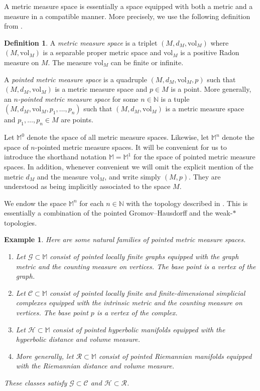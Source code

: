 \documentclass{amsart}
\newcommand{\NN}{\mathbb{N}}
\newcommand{\MM}{\mathbb{M}}
\newcommand{\Graphs}{\mathcal{G}}
\newcommand{\Complexes}{\mathcal{C}}
\newcommand{\Hypers}{\mathcal{H}}
\newcommand{\Riemanns}{\mathcal{R}}
\newcommand{\vol}{\mathrm{vol}}
\theoremstyle{plain}
\newtheorem{example}[theorem]{Example}
\numberwithin{equation}{section}
\theoremstyle{definition}
\newtheorem{definition}[theorem]{Definition}
\begin{document}
A metric measure space is essentially a space equipped with both a metric and a measure in a compatible manner. 
More precisely, we use the following  definition from \cite[\S3]{bowen2015cheeger}.


\begin{definition}
\label{def:metric measure space}
A \emph{metric measure space} is a triplet $(M,d_M,\vol_M)$ where $(M,\vol_M)$ is a  separable proper metric space and $\vol_M$ is a positive Radon measure on $M$. The measure $\vol_M$ can be finite or infinite.

A \emph{pointed metric measure space} is a quadruple $(M,d_M,\vol_M,p)$ such that $(M,d_M,\vol_M)$ is a metric measure space and $p \in M$ is a point. More generally, an \emph{$n$-pointed metric measure space} for some $n \in \NN$ is a tuple $(M,d_M,\vol_M,p_1,\ldots,p_n)$ such that $(M,d_M,\vol_M)$ is a metric measure space and $p_1,\ldots,p_n \in M$ are points.
\end{definition}

Let $\MM^0$ denote the space of all metric measure spaces.
Likewise,
let $\mathbb{M}^n$ denote the space of $n$-pointed metric measure spaces. It will be convenient for us to introduce the shorthand notation $\MM = \MM^1$ for the space of pointed metric measure spaces. In addition, whenever convenient  we will omit the explicit mention of the metric $d_M$ and the measure $\vol_M$, and write simply $(M,p)$. They are understood as being implicitly associated to the space $M$. 

We endow the space $\MM^n$ for each $n \in \NN$ with the topology described in \cite[Definition 5]{bowen2015cheeger}. This  is essentially a combination of the pointed Gromov--Hausdorff and the weak-$*$ topologies.

\begin{example}
\label{example:natural examples}
Here are some natural families of pointed metric measure spaces.

\begin{enumerate}
    \item Let $\Graphs \subset \MM$ consist of pointed locally finite graphs equipped with the graph metric and the counting measure on vertices. The  base point is a vertex of the graph.
        \item Let $\Complexes \subset \MM$ consist of pointed locally finite and finite-dimensional simplicial complexes  equipped with the intrinsic metric and the counting measure on vertices. The base point $p$ is a vertex of the complex.
\item Let   $\Hypers \subset \MM$ consist of pointed hyperbolic  manifolds  equipped with the hyperbolic distance and volume measure.
\item More generally, let $\Riemanns \subset \MM$ consist of pointed Riemannian manifolds equipped with the Riemannian distance and volume measure.
\end{enumerate}
These classes satisfy $\Graphs \subset \Complexes$ and $\Hypers \subset \Riemanns$.
\end{example}
\end{document}
